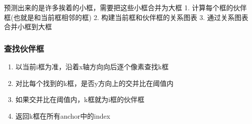 \documentclass[11pt]{article}
\providecommand{\tightlist}{%
      \setlength{\itemsep}{0pt}\setlength{\parskip}{0pt}}
\begin{document}
    预测出来的是许多挨着的小框，需要把这些小框合并为大框 1.
计算每个框的伙伴框(也就是和当前框相邻的框) 2.
构建当前框和伙伴框的关系图表 3. 通过关系图表合并小框到大框

    \hypertarget{ux67e5ux627eux4f19ux4f34ux6846}{%
\subsubsection{查找伙伴框}\label{ux67e5ux627eux4f19ux4f34ux6846}}

    \begin{enumerate}
\def\labelenumi{\arabic{enumi}.}
\tightlist
\item
  以当前i框为准，沿着x轴方向向后逐个像素查找k框\\
\item
  对比每个找到的k框，是否y方向上的交并比在阈值内
\item
  如果交并比在阈值内，k框就为i框的伙伴框
\item
  返回k框在所有anchor中的index
\end{enumerate}
\end{document}
